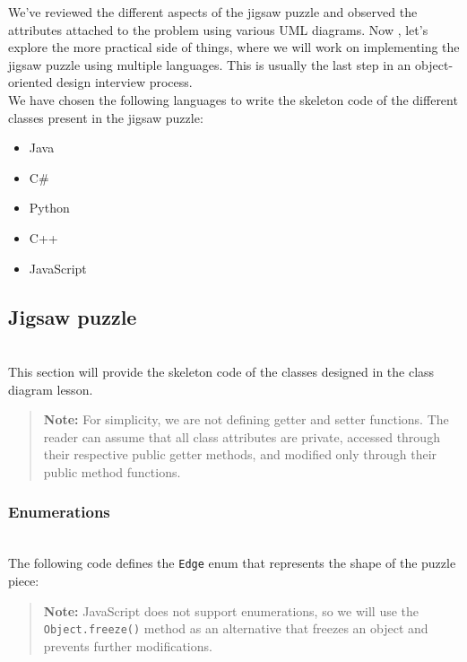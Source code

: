 

We've reviewed the different aspects of the jigsaw puzzle and observed the attributes attached to the problem using various UML diagrams. Now , let's explore the more practical side of things, where we will work on implementing the jigsaw puzzle using multiple languages. This is usually the last step in an object-oriented design interview process.
\\
We have chosen the following languages to write the skeleton code of the different classes present in the jigsaw puzzle:

\begin{itemize}
\item
\protect{}\label{mFJcZrlVIAIYPcgTd5uW7}
Java
\item
\protect{}\label{51963932twQ2rjqOuumFr}
C\#
\item
\protect{}\label{GAgCNG4XUgP-Tf4CK-qwV}
Python
\item
\protect{}\label{7Usalcza3xyWDLobHHCSJ}
C++
\item
\protect{}\label{ABeGXGdtC3tNeXK6Zl4S7}
JavaScript
\end{itemize}

\subsection{Jigsaw puzzle}\label{nySktjHQfz4_kAZzIOt8G}
\\
This section will provide the skeleton code of the classes designed in the class diagram lesson.
\begin{quote}
\textbf{Note:} For simplicity, we are not defining getter and setter functions. The reader can assume that all class attributes are private, accessed through their respective public getter methods, and modified only through their public method functions.
\end{quote}
\subsubsection{Enumerations}\label{FK3Cg7Ck_xXgfE9n5k-cQ}
\\
The following code defines the \texttt{Edge} enum that represents the shape of the puzzle piece:
\begin{quote}
\textbf{Note:} JavaScript does not support enumerations, so we will use the \texttt{Object.freeze()} method as an alternative that freezes an object and prevents further modifications.
\end{quote}

